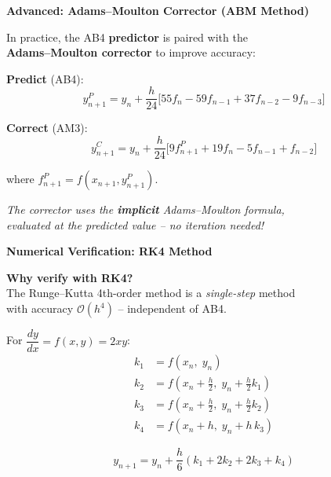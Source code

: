 \documentclass[12pt]{beamer}
\begin{document}
\begin{frame}{\textbf{Advanced: Adams--Moulton Corrector (ABM Method)}}
  \begin{center}
    \vfill
    In practice, the AB4 \textbf{predictor} is paired with the\\ \textbf{Adams--Moulton corrector} to improve accuracy:

    \vspace{1em}
    \textbf{Predict} (AB4):
    \[
      y_{n+1}^P = y_n + \frac{h}{24}\bigl[55f_n - 59f_{n-1} + 37f_{n-2} - 9f_{n-3}\bigr]
    \]

    \vspace{0.8em}
    \textbf{Correct} (AM3):
    \[
      y_{n+1}^C = y_n + \frac{h}{24}\bigl[9f_{n+1}^P + 19f_n - 5f_{n-1} + f_{n-2}\bigr]
    \]

    \vspace{1em}
    where $f_{n+1}^P = f(x_{n+1}, y_{n+1}^P)$.

    \vspace{1em}
    \textit{The corrector uses the \textbf{implicit} Adams--Moulton formula,\\
    evaluated at the predicted value -- no iteration needed!}
    \vfill
  \end{center}
\end{frame}


\begin{frame}{\textbf{Numerical Verification: RK4 Method}}
  \begin{center}
    \vfill
    \textbf{Why verify with RK4?}\\
    The Runge--Kutta 4th-order method is a \textit{single-step} method\\[0.3em]
    with accuracy $\mathcal{O}(h^4)$ -- independent of AB4.

    \vspace{1em}
    For $\dfrac{dy}{dx} = f(x, y) = 2xy$:
    \begin{align*}
      k_1 &= f(x_n,\; y_n) \\
      k_2 &= f\!\left(x_n + \tfrac{h}{2},\; y_n + \tfrac{h}{2}k_1\right) \\
      k_3 &= f\!\left(x_n + \tfrac{h}{2},\; y_n + \tfrac{h}{2}k_2\right) \\
      k_4 &= f(x_n + h,\; y_n + h\,k_3)
    \end{align*}

    \vspace{0.5em}
    \[
      y_{n+1} = y_n + \frac{h}{6}(k_1 + 2k_2 + 2k_3 + k_4)
    \]
    \vfill
  \end{center}
\end{frame}
\end{document}
